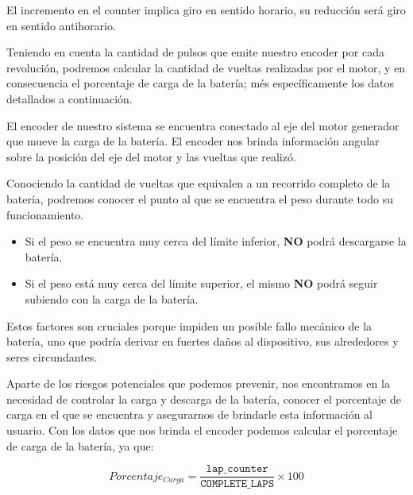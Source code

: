                     El incremento en el counter implica giro en sentido horario, su reducción será giro en sentido antihorario.\par
                    Teniendo en cuenta la cantidad de pulsos que emite nuestro encoder por cada revolución, podremos calcular la cantidad de vueltas realizadas por el motor, y en consecuencia el porcentaje de carga de la batería; més específicamente los datos detallados a continuación.\par

                    El encoder de nuestro sistema se encuentra conectado al eje del motor generador que mueve la carga de la batería. El encoder nos brinda información angular sobre la posición del eje del motor y las vueltas que realizó.\par
                    Conociendo la cantidad de vueltas que equivalen a un recorrido completo de la batería, podremos conocer el punto al que se encuentra el peso durante todo su funcionamiento.\par
                    
                    \begin{itemize} [label=•]
                \setlength{\itemindent}{1.5em}
                        \item Si el peso se encuentra muy cerca del límite inferior, \textbf{NO} podrá descargarse la batería.
                        \item Si el peso está muy cerca del límite superior, el mismo \textbf{NO} podrá seguir subiendo con la carga de la batería.\par
                    \end{itemize}
                    
                    Estos factores son cruciales porque impiden un posible fallo mecánico de la batería, uno que podría derivar en fuertes daños al dispositivo, sus alrededores y seres circundantes.\par
                    Aparte de los riesgos potenciales que podemos prevenir, nos encontramos en la necesidad de controlar la carga y descarga de la batería, conocer el porcentaje de carga en el que se encuentra y asegurarnos de brindarle esta información al usuario. Con los datos que nos brinda el encoder podemos calcular el porcentaje de carga de la batería, ya que:\par

                    \begin{equation}
                        Porcentaje_{Carga} = \frac{\texttt{lap\_counter}}{\texttt{COMPLETE\_LAPS}} \times 100
                    \end{equation}
                    
